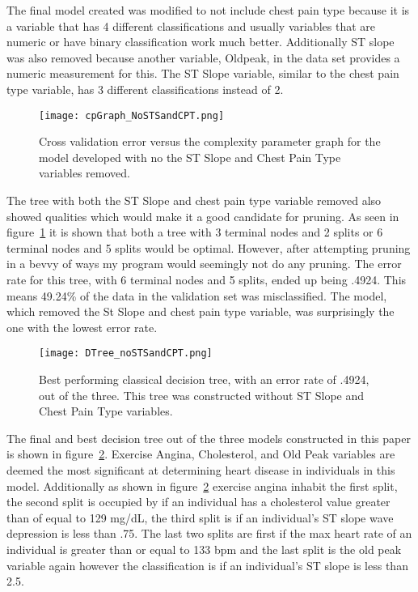 \documentclass[12pt]{article}
\begin{document}
The final model created was modified to not include chest pain type because it is a variable that has 4 different classifications and usually variables that are numeric or have binary classification work much better. Additionally ST slope was also removed because another variable, Oldpeak, in the data set provides a numeric measurement for this. The ST Slope variable, similar to the chest pain type variable, has 3 different classifications instead of 2.
\begin{figure}[p]
  \centering
  \texttt{[image: cpGraph\_NoSTSandCPT.png]}
  \caption{Cross validation error versus the complexity parameter graph for the model developed with no the ST Slope and Chest Pain Type variables removed.}
  \label{fig:cpGraph_NoSTSandCPT}
\end{figure} 
The tree with both the ST Slope and chest pain type variable removed also showed qualities which would make it a good candidate for pruning. As seen in figure~\ref*{fig:cpGraph_NoSTSandCPT} it is shown that both a tree with 3 terminal nodes and 2 splits or 6 terminal nodes and 5 splits would be optimal. However, after attempting pruning in a bevvy of ways my program would seemingly not do any pruning. The error rate for this tree, with 6 terminal nodes and 5 splits, ended up being .4924. This means 49.24\% of the data in the validation set was misclassified. The model, which removed the St Slope and chest pain type variable, was surprisingly the one with the lowest error rate. \par
\begin{figure}[p]
  \centering
  \texttt{[image: DTree\_noSTSandCPT.png]}
  \caption{Best performing classical decision tree, with an error rate of .4924, out of the three. This tree was constructed without ST Slope and Chest Pain Type variables. }
  \label{fig:DTree_noSTSandCPT}
\end{figure} 
The final and best decision tree out of the three models constructed in this paper is shown in figure~\ref*{fig:DTree_noSTSandCPT}. Exercise Angina, Cholesterol, and Old Peak variables are deemed the most significant at determining heart disease in individuals in this model. Additionally as shown in figure~\ref*{fig:DTree_noSTSandCPT} exercise angina inhabit the first split, the second split is occupied by if an individual has a cholesterol value greater than of equal to 129 mg/dL, the third split is if an individual's ST slope wave depression is less than .75. The last two splits are first if the max heart rate of an individual is greater than or equal to 133 bpm and the last split is the old peak variable again however the classification is if an individual's ST slope is less than 2.5. \par
\newpage
\end{document}
